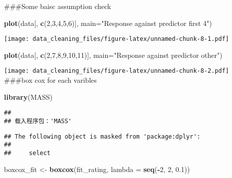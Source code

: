 \documentclass[
]{article}
\newenvironment{Shaded}{\begin{snugshade}}{\end{snugshade}}
\newcommand{\AttributeTok}[1]{\textcolor[rgb]{0.13,0.29,0.53}{#1}}
\newcommand{\DecValTok}[1]{\textcolor[rgb]{0.00,0.00,0.81}{#1}}
\newcommand{\FloatTok}[1]{\textcolor[rgb]{0.00,0.00,0.81}{#1}}
\newcommand{\FunctionTok}[1]{\textcolor[rgb]{0.13,0.29,0.53}{\textbf{#1}}}
\newcommand{\NormalTok}[1]{#1}
\newcommand{\OtherTok}[1]{\textcolor[rgb]{0.56,0.35,0.01}{#1}}
\newcommand{\SpecialCharTok}[1]{\textcolor[rgb]{0.81,0.36,0.00}{\textbf{#1}}}
\newcommand{\StringTok}[1]{\textcolor[rgb]{0.31,0.60,0.02}{#1}}
\begin{document}
\#\#\#Some baisc assumption check

\begin{Shaded}
\begin{Highlighting}[]
\FunctionTok{plot}\NormalTok{(data[, }\FunctionTok{c}\NormalTok{(}\DecValTok{2}\NormalTok{,}\DecValTok{3}\NormalTok{,}\DecValTok{4}\NormalTok{,}\DecValTok{5}\NormalTok{,}\DecValTok{6}\NormalTok{)], }\AttributeTok{main=}\StringTok{"Response against predictor first 4"}\NormalTok{)}
\end{Highlighting}
\end{Shaded}

\texttt{[image: data\_cleaning\_files/figure-latex/unnamed-chunk-8-1.pdf]}

\begin{Shaded}
\begin{Highlighting}[]
\FunctionTok{plot}\NormalTok{(data[, }\FunctionTok{c}\NormalTok{(}\DecValTok{2}\NormalTok{,}\DecValTok{7}\NormalTok{,}\DecValTok{8}\NormalTok{,}\DecValTok{9}\NormalTok{,}\DecValTok{10}\NormalTok{,}\DecValTok{11}\NormalTok{)], }\AttributeTok{main=}\StringTok{"Response against predictor other"}\NormalTok{)}
\end{Highlighting}
\end{Shaded}

\texttt{[image: data\_cleaning\_files/figure-latex/unnamed-chunk-8-2.pdf]}
\#\#\#box cox for each varibles

\begin{Shaded}
\begin{Highlighting}[]
\FunctionTok{library}\NormalTok{(MASS)}
\end{Highlighting}
\end{Shaded}

\begin{verbatim}
## 
## 载入程序包：'MASS'
\end{verbatim}

\begin{verbatim}
## The following object is masked from 'package:dplyr':
## 
##     select
\end{verbatim}

\begin{Shaded}
\begin{Highlighting}[]
\NormalTok{boxcox\_fit }\OtherTok{\textless{}{-}} \FunctionTok{boxcox}\NormalTok{(fit\_rating, }\AttributeTok{lambda =} \FunctionTok{seq}\NormalTok{(}\SpecialCharTok{{-}}\DecValTok{2}\NormalTok{, }\DecValTok{2}\NormalTok{, }\FloatTok{0.1}\NormalTok{))  }
\end{Highlighting}
\end{Shaded}
\end{document}
